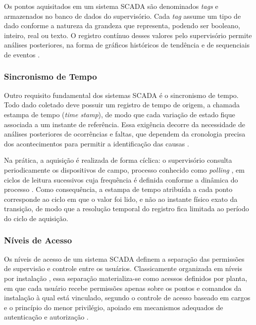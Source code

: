 \par Os pontos aquisitados em um sistema SCADA são denominados \emph{tags} e armazenados no banco de dados do supervisório. Cada \emph{tag} assume um tipo de dado conforme a natureza da grandeza que representa, podendo ser booleano, inteiro, real ou texto. O registro contínuo desses valores pelo supervisório permite análises posteriores, na forma de gráficos históricos de tendência e de sequenciais de eventos \cite{ZANGHI2019_SCADA_CONCEITOS}.

\subsubsection{Sincronismo de Tempo}

\par Outro requisito fundamental dos sistemas SCADA é o sincronismo de tempo. Todo dado coletado deve possuir um registro de tempo de origem, a chamada estampa de tempo (\emph{time stamp}), de modo que cada variação de estado fique associada a um instante de referência. Essa exigência decorre da necessidade de análises posteriores de ocorrências e faltas, que dependem da cronologia precisa dos acontecimentos para permitir a identificação das causas \cite{ZANGHI2019_SCADA_CONCEITOS}.

\par Na prática, a aquisição é realizada de forma cíclica: o supervisório consulta periodicamente os dispositivos de campo, processo conhecido como \emph{polling} \cite{STOUFFER2015_NIST_ICS_SECURITY}, em ciclos de leitura sucessivos cuja frequência é definida conforme a dinâmica do processo \cite{YADAV2020_SCADA_ARCHITECTURE_REVIEW}. Como consequência, a estampa de tempo atribuída a cada ponto corresponde ao ciclo em que o valor foi lido, e não ao instante físico exato da transição, de modo que a resolução temporal do registro fica limitada ao período do ciclo de aquisição.

\subsubsection{Níveis de Acesso}

\par Os níveis de acesso de um sistema SCADA definem a separação das permissões de supervisão e controle entre os usuários. Classicamente organizada em níveis por instalação \cite{ZANGHI2019_SCADA_CONCEITOS}, essa separação materializa-se como acessos definidos por planta, em que cada usuário recebe permissões apenas sobre os pontos e comandos da instalação à qual está vinculado, segundo o controle de acesso baseado em cargos e o princípio do menor privilégio, apoiado em mecanismos adequados de autenticação e autorização \cite{STOUFFER2015_NIST_ICS_SECURITY}.

